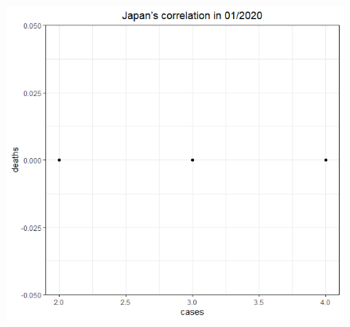 \documentclass[english,10pt,table]{beamer}
\begin{document}
{\begin{figure}[H]
\begin{center}
        \includegraphics[scale = 0.2]{ix/ix.2/JPN_01_2020.png}
        

\end{center}
\end{figure}}
\end{document}
